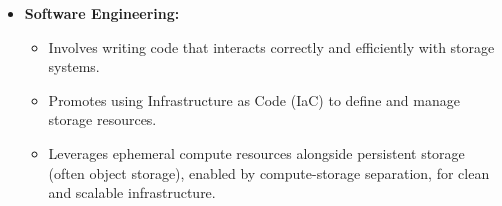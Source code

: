 \begin{itemize}
    \item \textbf{Software Engineering:}
    \begin{itemize}
        \item Involves writing code that interacts correctly and
        efficiently with storage systems.

        \item Promotes using Infrastructure as Code (IaC) to define
        and manage storage resources.
        
        \item Leverages ephemeral compute resources alongside
        persistent storage (often object storage), enabled by
        compute-storage separation, for clean and scalable
        infrastructure.
    \end{itemize}
\end{itemize}


